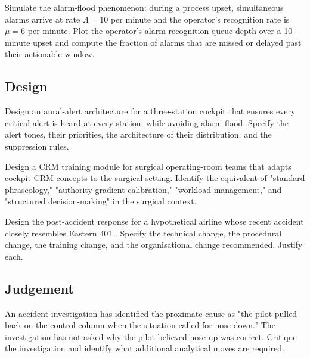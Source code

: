 \begin{exercise}
Simulate the alarm-flood phenomenon: during a process upset, simultaneous alarms arrive at rate $\Lambda = 10$ per minute and the operator's recognition rate is $\mu = 6$ per minute. Plot the operator's alarm-recognition queue depth over a 10-minute upset and compute the fraction of alarms that are missed or delayed past their actionable window.
\end{exercise}

\subsection*{Design}

\begin{exercise}
Design an aural-alert architecture for a three-station cockpit that ensures every critical alert is heard at every station, while avoiding alarm flood. Specify the alert tones, their priorities, the architecture of their distribution, and the suppression rules.
\end{exercise}

\begin{exercise}
Design a CRM training module for surgical operating-room teams that adapts cockpit CRM concepts to the surgical setting. Identify the equivalent of "standard phraseology," "authority gradient calibration," "workload management," and "structured decision-making" in the surgical context.
\end{exercise}

\begin{exercise}
Design the post-accident response for a hypothetical airline whose recent accident closely resembles Eastern 401 \cite{acc:ntsb-aar73-14}. Specify the technical change, the procedural change, the training change, and the organisational change recommended. Justify each.
\end{exercise}

\subsection*{Judgement}

\begin{exercise}
An accident investigation has identified the proximate cause as "the pilot pulled back on the control column when the situation called for nose down." The investigation has not asked why the pilot believed nose-up was correct. Critique the investigation and identify what additional analytical moves are required.
\end{exercise}

